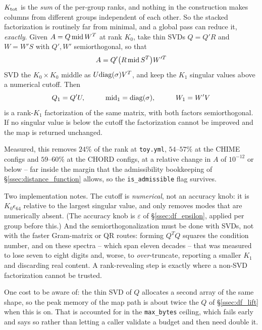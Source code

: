 \documentclass{article}
\numberwithin{equation}{section}   %
\begin{document}
$K_{\rm tot}$ is the {\em sum} of the per-group ranks, and nothing in the construction makes
columns from different groups independent of each other. So the stacked factorization is
routinely far from minimal, and a global pass can reduce it, {\em exactly}. Given $A = Q\,{\rm
mid}\,W^T$ at rank $K_0$, take thin SVDs $Q = Q'R$ and $W = W'S$ with $Q', W'$ semiorthogonal, so
that
\begin{equation}
A = Q' \big( R \, {\rm mid} \, S^T \big) W'^T
\end{equation}
SVD the $K_0 \times K_0$ middle as $U {\rm diag}(\sigma) V^T$, and keep the $K_1$ singular values
above a numerical cutoff. Then
\begin{equation}
Q_1 = Q'U, \hspace{1cm} {\rm mid}_1 = {\rm diag}(\sigma), \hspace{1cm} W_1 = W'V
\end{equation}
is a rank-$K_1$ factorization of the same matrix, with both factors semiorthogonal. If no
singular value is below the cutoff the factorization cannot be improved and the map is returned
unchanged.

Measured, this removes $24\%$ of the rank at {\tt toy.yml}, $54$--$57\%$ at the CHIME configs and
$59$--$60\%$ at the CHORD configs, at a relative change in $A$ of $10^{-12}$ or below -- far
inside the margin that the admissibility bookkeeping of \S\ref{ssec:distance_function} allows, so
the {\tt is\_admissible} flag survives.

Two implementation notes. The cutoff is {\em numerical}, not an accuracy knob: it is
$K_0 \epsilon_{64}$ relative to the largest singular value, and only removes modes that are
numerically absent. (The accuracy knob is $\varepsilon$ of \S\ref{ssec:df_epsilon}, applied per
group before this.) And the semiorthogonalization must be done with SVDs, not with the faster
Gram-matrix or QR routes: forming $Q^TQ$ squares the condition number, and on these spectra --
which span eleven decades -- that was measured to lose seven to eight digits and, worse, to
{\em over}-truncate, reporting a smaller $K_1$ and discarding real content. A rank-revealing step
is exactly where a non-SVD factorization cannot be trusted.

One cost to be aware of: the thin SVD of $Q$ allocates a second array of the same shape, so the
peak memory of the map path is about twice the $Q$ of \S\ref{ssec:df_lift} when this is on. That
is accounted for in the {\tt max\_bytes} ceiling, which fails early and says so rather than
letting a caller validate a budget and then need double it.
\end{document}
